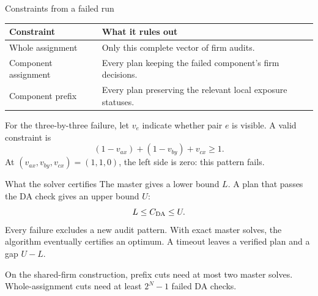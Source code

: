 \begin{frame}[t,label=cuts]{Constraints from a failed run}
\small
\begin{tabularx}{\linewidth}{@{}lX@{}}
\toprule
Constraint & What it rules out\\
\midrule
Whole assignment & Only this complete vector of firm audits.\\[4pt]
Component assignment & Every plan keeping the failed component's firm decisions.\\[4pt]
Component prefix & Every plan preserving the relevant local exposure statuses.\\
\bottomrule
\end{tabularx}
\par\medskip
For the three-by-three failure, let $v_e$ indicate whether pair $e$ is visible.
A valid constraint is
\[
 (1-v_{ax})+(1-v_{by})+v_{cx}\geq1.
\]
At $(v_{ax},v_{by},v_{cx})=(1,1,0)$, the left side is zero: this pattern fails.
\end{frame}

\begin{frame}[t,label=guarantees]{What the solver certifies}
\small
The master gives a lower bound $L$. A plan that passes the DA check gives
an upper bound $U$:
\[
 L\leq C_{\mathrm{DA}}\leq U.
\]
Every failure excludes a new audit pattern. With exact master solves,
the algorithm eventually certifies an optimum. A timeout leaves a verified
plan and a gap $U-L$.

\medskip
On the shared-firm construction, prefix cuts need at most two master solves.
Whole-assignment cuts need at least $2^N-1$ failed DA checks.
\end{frame}
